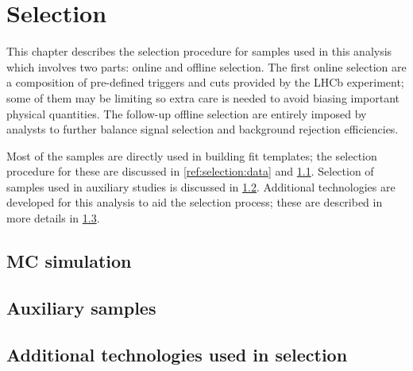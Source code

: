 \chapter{Selection}
\label{ref:selection}

This chapter describes the selection procedure for samples used in this
analysis which involves two parts: online and offline selection.
The first online selection are a composition of
pre-defined triggers and cuts provided by the LHCb experiment;
some of them may be limiting so extra care is needed to avoid biasing important
physical quantities.
The follow-up offline selection are entirely imposed by analysts
to further balance signal selection and background rejection efficiencies.

Most of the samples are directly used in building fit templates;
the selection procedure for these are discussed in \cref{ref:selection:data} and
\cref{ref:selection:mc}.
Selection of samples used in auxiliary studies is discussed in
\cref{ref:selection:aux-study}.
Additional technologies are developed for this analysis to aid the selection
process; these are described in more details in
\cref{ref:selection:tech}.





\section{MC simulation}
\label{ref:selection:mc}


\section{Auxiliary samples}
\label{ref:selection:aux-study}


\section{Additional technologies used in selection}
\label{ref:selection:tech}




